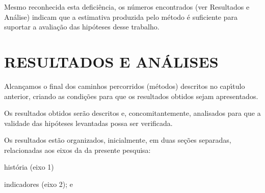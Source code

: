 \documentclass[
12pt,		%
openright,	%
twoside,  %
a4paper,			%
chapter=TITLE,		%
english,			%
french,				%
spanish,			%
brazil				%
]{USPSC-classe/USPSC}
\begin{document}
Mesmo reconhecida esta defici\^encia, os n\'umeros encontrados (ver Resultados e An\'alise) indicam que a estimativa produzida pelo m\'etodo \'e suficiente para suportar a avalia\c{c}\~ao das hip\'oteses desse trabalho.

















\chapter[RESULTADOS E AN\'ALISES]{RESULTADOS E AN\'ALISES}\label{RESULTADOS E AN\'ALISES}
Alcan\c{c}amos o final dos caminhos percorridos (m\'etodos) descritos no cap\'{\i}tulo anterior, criando as condi\c{c}\~oes para que os resultados obtidos sejam apresentados.

















Os resultados obtidos ser\~ao descritos e, concomitantemente, analisados para que a validade das hip\'oteses levantadas possa ser verificada.

















Os resultados est\~ao organizados, inicialmente, em duas se\c{c}\~oes separadas, relacionadas aos eixos da da presente pesquisa:


















\begin{alineas}
\item hist\'oria (eixo 1)
\item indicadores (eixo 2); e
\end{alineas}
\end{document}
